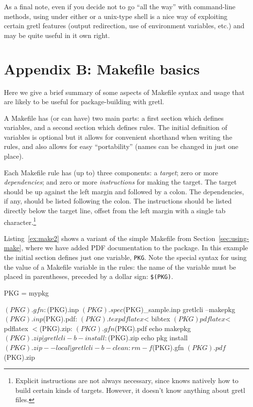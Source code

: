 \documentclass[oneside]{book}
\begin{document}
As a final note, even if you decide not to go ``all the way'' with
command-line methods, using  under either 
or a unix-type shell is a nice way of exploiting certain gretl
features (output redirection, use of environment variables, etc.) and
may be quite useful in it own right.


\section*{Appendix B: Makefile basics}

Here we give a brief summary of some aspects of Makefile syntax and
usage that are likely to be useful for package-building with gretl.

A Makefile has (or can have) two main parts: a first section which
defines variables, and a second section which defines rules. The
initial definition of variables is optional but it allows for
convenient shorthand when writing the rules, and also allows for easy
``portability'' (names can be changed in just one place).

Each Makefile rule has (up to) three components: a \textit{target};
zero or more \textit{dependencies}; and zero or more
\textit{instructions} for making the target. The target should be up
against the left margin and followed by a colon. The dependencies, if
any, should be listed following the colon. The instructions should be
listed directly below the target line, offset from the left margin
with a single tab character.\footnote{Explicit instructions are not
  always necessary, since  knows natively how to build
  certain kinds of targets. However, it doesn't know anything about
  gretl files.}

Listing~\ref{ex:make2} shows a variant of the simple Makefile from
Section~\ref{sec:using-make}, where we have added PDF documentation to
the package. In this example the initial section defines just one
variable, \texttt{PKG}. Note the special syntax for using the value of
a Makefile variable in the rules: the name of the variable must be
placed in parentheses, preceded by a dollar sign: \texttt{\$(PKG)}.

\begin{script}[htbp]
  \caption{Makefile for package with PDF documentation}
  \label{ex:make2}
\begin{scode}
PKG = mypkg

$(PKG).gfn: $(PKG).inp $(PKG).spec $(PKG)_sample.inp
	gretlcli --makepkg $(PKG).inp

$(PKG).pdf: $(PKG).tex
        pdflatex $<
        bibtex $(PKG)
        pdflatex $<
        pdflatex $<

$(PKG).zip: $(PKG).gfn $(PKG).pdf
	echo makepkg $(PKG).zip | gretlcli -b -

install: $(PKG).zip
	echo pkg install $(PKG).zip --local | gretlcli -b -

clean:
	rm -f $(PKG).gfn $(PKG).pdf $(PKG).zip
\end{scode}
\end{script}
\end{document}
